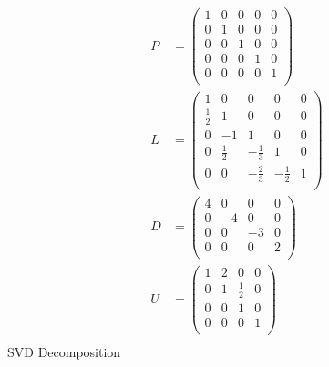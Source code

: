 \documentclass{article}
\begin{document}
\begin{equation*}
\begin{aligned}
P &=
\begin{pmatrix}
    1 & 0 & 0 & 0 & 0\\
    0 & 1 & 0 & 0 & 0\\
    0 & 0 & 1 & 0 & 0\\
    0 & 0 & 0 & 1 & 0\\
    0 & 0 & 0 & 0 & 1\\
\end{pmatrix} \\
L &= 
\begin{pmatrix}
    1 & 0 & 0 & 0 & 0\\
    \frac{1}{2} & 1 & 0 & 0 & 0 \\
    0 & -1 & 1 & 0 & 0\\
    0 & \frac{1}{2} & -\frac{1}{3} & 1 & 0\\
    0 & 0 & -\frac{2}{3} & -\frac{1}{2} & 1\\
\end{pmatrix} \\
D &= 
\begin{pmatrix}
    4 & 0 & 0 & 0 \\
    0 & -4 & 0 & 0 \\
    0 & 0 & -3 & 0 \\
    0 & 0 & 0 & 2 \\
\end{pmatrix} \\
U &= 
\begin{pmatrix}
    1 & 2 & 0 & 0 \\
    0 & 1 & \frac{1}{2} & 0 \\
    0 & 0 & 1 & 0 \\
    0 & 0 & 0 & 1 \\
\end{pmatrix} \\
\end{aligned}
\end{equation*}
SVD Decomposition \\
\end{document}
